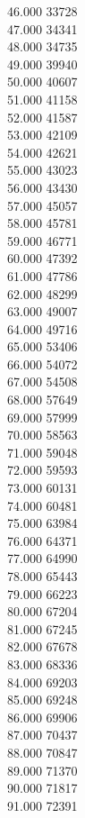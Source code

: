 { 46.000	33728 \\
 47.000	34341 \\
 48.000	34735 \\
 49.000	39940 \\
 50.000	40607 \\
 51.000	41158 \\
 52.000	41587 \\
 53.000	42109 \\
 54.000	42621 \\
 55.000	43023 \\
 56.000	43430 \\
 57.000	45057 \\
 58.000	45781 \\
 59.000	46771 \\
 60.000	47392 \\
 61.000	47786 \\
 62.000	48299 \\
 63.000	49007 \\
 64.000	49716 \\
 65.000	53406 \\
 66.000	54072 \\
 67.000	54508 \\
 68.000	57649 \\
 69.000	57999 \\
 70.000	58563 \\
 71.000	59048 \\
 72.000	59593 \\
 73.000	60131 \\
 74.000	60481 \\
 75.000	63984 \\
 76.000	64371 \\
 77.000	64990 \\
 78.000	65443 \\
 79.000	66223 \\
 80.000	67204 \\
 81.000	67245 \\
 82.000	67678 \\
 83.000	68336 \\
 84.000	69203 \\
 85.000	69248 \\
 86.000	69906 \\
 87.000	70437 \\
 88.000	70847 \\
 89.000	71370 \\
 90.000	71817 \\
 91.000	72391 \\
}
